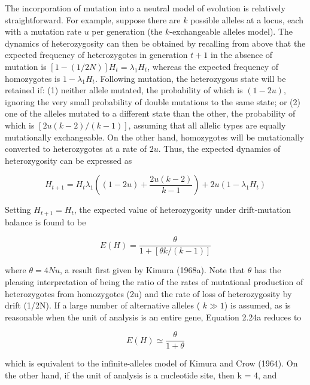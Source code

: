 \documentclass{article}
\begin{document}
The incorporation of mutation into a neutral model of evolution is relatively straightforward. For example, suppose there are  $ k $ possible alleles at a locus, each with a mutation rate  $ u $ per generation (the  $ k $-exchangeable alleles model). The dynamics of heterozygosity can then be obtained by recalling from above that the expected frequency of heterozygotes in generation  $ t + 1 $ in the absence of mutation is  $ [1 - (1/2N)]H_t = \lambda_1H_t $, whereas the expected frequency of homozygotes is  $ 1 - \lambda_1H_t $. Following mutation, the heterozygous state will be retained if: (1) neither allele mutated, the probability of which is  $ (1 - 2u) $, ignoring the very small probability of double mutations to the same state; or (2) one of the alleles mutated to a different state than the other, the probability of which is  $ [2u(k - 2)/(k - 1)] $, assuming that all allelic types are equally mutationally exchangeable. On the other hand, homozygotes will be mutationally converted to heterozygotes at a rate of  $ 2u $. Thus, the expected dynamics of heterozygosity can be expressed as

\begin{equation}
H_{t+1}=H_{t}\lambda_{1}\left((1-2u)+\frac{2u(k-2)}{k-1}\right)+2u(1-\lambda_{1}H_{t})
\tag{2.23}
\label{eq:2_23}
\end{equation}

Setting  $ H_{t+1} = H_t $, the expected value of heterozygosity under drift-mutation balance is found to be

\begin{equation}
E(H)=\frac{\theta}{1+[\theta k/(k-1)]}
\tag{2.24a}
\label{eq:2_24a}
\end{equation}

where  $ \theta = 4N u $, a result first given by Kimura (1968a). Note that  $ \theta $ has the pleasing interpretation of being the ratio of the rates of mutational production of heterozygotes from homozygotes (2u) and the rate of loss of heterozygosity by drift (1/2N). If a large number of alternative alleles ( $ k \gg 1 $) is assumed, as is reasonable when the unit of analysis is an entire gene, Equation 2.24a reduces to

\begin{equation}
E(H)\simeq\frac{\theta}{1+\theta}
\tag{2.24b}
\label{eq:2_24b}
\end{equation}

which is equivalent to the infinite-alleles model of Kimura and Crow (1964). On the other hand, if the unit of analysis is a nucleotide site, then k = 4, and
\end{document}
